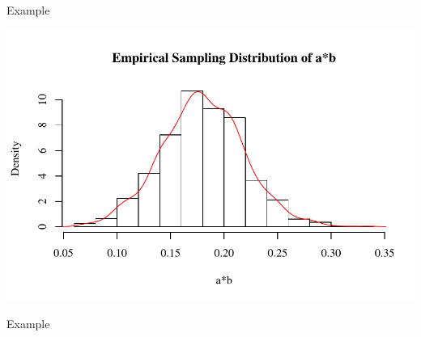 \documentclass{beamer}
\begin{document}
\begin{frame}[allowframebreaks]{Example}
  


\pagebreak


\includegraphics{sweaveFiles/-009}

\pagebreak



\end{frame}


\begin{frame}[shrink = 15]{Example}
  


\end{frame}
  
\end{document}
